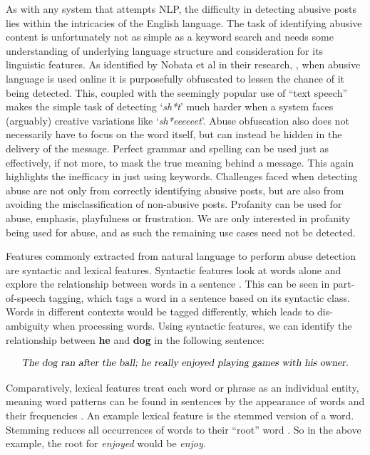 As with any system that attempts NLP, the difficulty in detecting abusive posts lies within the intricacies of the English language. The task of identifying abusive content is unfortunately not as simple as a keyword search and needs some understanding of underlying language structure and consideration for its linguistic features. As identified by Nobata et al in their research, \cite{nobata2016abusive}, when abusive language is used online it is purposefully obfuscated to lessen the chance of it being detected. This, coupled with the seemingly popular use of ``text speech'' makes the simple task of detecting `\emph{sh*t}' much harder when a system faces (arguably) creative variations like `\emph{sh*eeeeeet}'. Abuse obfuscation also does not necessarily have to focus on the word itself, but can instead be hidden in the delivery of the message. Perfect grammar and spelling can be used just as effectively, if not more, to mask the true meaning behind a message. This again highlights the inefficacy in just using keywords. Challenges faced when detecting abuse are not only from correctly identifying abusive posts, but are also from avoiding the misclassification of non-abusive posts. Profanity can be used for abuse, emphasis, playfulness or frustration. We are only interested in profanity being used for abuse, and as such the remaining use cases need not be detected. 

Features commonly extracted from natural language to perform abuse detection are syntactic and lexical features. Syntactic features look at words alone and explore the relationship between words in a sentence \cite{liao2010large}. This can be seen in part-of-speech tagging, which tags a word in a sentence based on its syntactic class. Words in different contexts would be tagged differently, which leads to dis-ambiguity when processing words. Using syntactic features, we can identify the relationship between \textbf{he} and \textbf{dog} in the following sentence:

\begin{equation}
\label{eq:semantic}
\mbox{\textsl{The dog ran after the ball; he really enjoyed playing games with his owner.}}
\end{equation}

Comparatively, lexical features treat each word or phrase as an individual entity, meaning word patterns can be found in sentences by the appearance of words and their frequencies \cite{chen2012detecting}. An example lexical feature is the stemmed version of a word. Stemming reduces all occurrences of words to their ``root'' word \cite{Elastic:Stem}. So in the above example, the root for \emph{enjoyed} would be \emph{enjoy}. 

